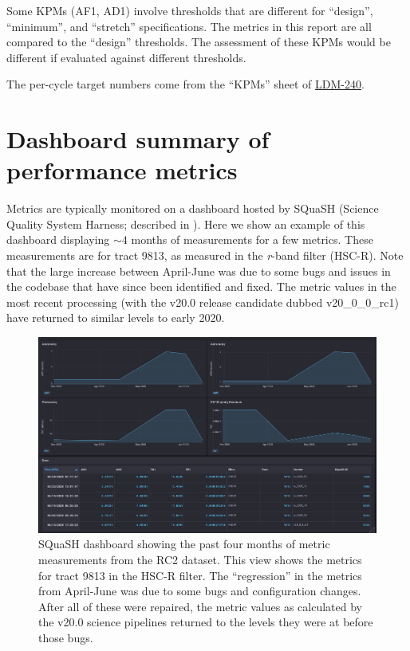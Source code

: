 \documentclass[DM,lsstdraft,toc]{lsstdoc}
\begin{document}
Some KPMs (AF1, AD1) involve thresholds that are different for ``design'', ``minimum'', and ``stretch'' specifications. The metrics in this report are all compared to the ``design'' thresholds. The assessment of these KPMs would be different if evaluated against different thresholds.

The per-cycle target numbers come from the ``KPMs'' sheet of \href{http://ls.st/LDM-240}{LDM-240}.

\section{Dashboard summary of performance metrics}

Metrics are typically monitored on a dashboard hosted by SQuaSH (Science Quality System Harness; described in ). Here we show an example of this dashboard displaying $\sim4$ months of measurements for a few metrics. These measurements are for tract 9813, as measured in the \emph{r}-band filter (HSC-R). Note that the large increase between April-June was due to some bugs and issues in the codebase that have since been identified and fixed. The metric values in the most recent processing (with the v20.0 release candidate dubbed v20\_0\_0\_rc1) have returned to similar levels to early 2020.

\begin{figure}
\includegraphics[width=1.0\columnwidth]{figures/SQuaSH_dashboard_RC2_tract9813.png}
\caption{SQuaSH dashboard showing the past four months of metric measurements from the RC2 dataset. This view shows the metrics for tract 9813 in the HSC-R filter. The ``regression'' in the metrics from April-June was due to some bugs and configuration changes. After all of these were repaired, the metric values as calculated by the v20.0 science pipelines returned to the levels they were at before those bugs.}
\end{figure}
\end{document}
